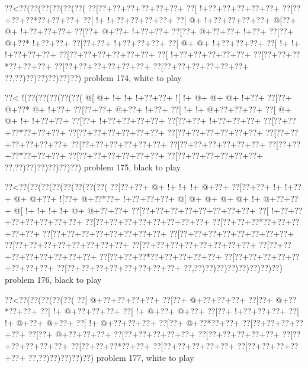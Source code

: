 \vbox{\vbox{\goo
\0??<\0??(\0??(\0??(\0??(\0??(\0??(
\0??[\0??+\0??+\0??+\0??+\0??+\0??+
\0??[\- !+\0??+\0??+\0??+\0??+\0??+
\0??[\0??+\0??+\0??*\0??+\0??+\0??+
\0??[\- !+\- !+\0??+\0??+\0??+\0??+
\0??[\- @+\- !+\0??+\0??+\0??+\0??+
\- @[\0??+\- @+\- !+\0??+\0??+\0??+
\0??[\0??+\- @+\0??+\- !+\0??+\0??+
\0??[\0??+\- @+\0??+\0??+\- !+\0??+
\0??[\0??+\- @+\0??*\- !+\0??+\0??+
\0??[\0??+\0??+\- !+\0??+\0??+\0??+
\0??[\- @+\- @+\- !+\0??+\0??+\0??+
\0??[\- !+\- !+\- !+\0??+\0??+\0??+
\0??[\0??+\0??+\0??+\0??+\0??+\0??+
\0??[\- !+\0??+\0??+\0??+\0??+\0??+
\0??[\0??+\0??+\0??*\0??+\0??+\0??+
\0??[\0??+\0??+\0??+\0??+\0??+\0??+
\0??[\0??+\0??+\0??+\0??+\0??+\0??+
\0??,\0??)\0??)\0??)\0??)\0??)\0??)
}
\hfil problem 174, white to play\hfil\break
}

\vbox{\vbox{\goo
\0??<\- !(\0??(\0??(\0??(\0??(\0??(
\- @[\- @+\- !+\- !+\- !+\0??+\0??+
\- ![\- !+\- @+\- @+\- @+\- !+\0??+
\0??[\0??+\- @+\0??*\- @+\- !+\0??+
\0??[\0??+\0??+\- @+\0??+\- !+\0??+
\0??[\- !+\- !+\- @+\0??+\0??+\0??+
\0??[\- @+\- @+\- !+\- !+\0??+\0??+
\0??[\0??+\- !+\0??+\0??+\0??+\0??+
\0??[\0??+\0??+\- !+\0??+\0??+\0??+
\0??[\0??+\0??+\0??*\0??+\0??+\0??+
\0??[\0??+\0??+\0??+\0??+\0??+\0??+
\0??[\0??+\0??+\0??+\0??+\0??+\0??+
\0??[\0??+\0??+\0??+\0??+\0??+\0??+
\0??[\0??+\0??+\0??+\0??+\0??+\0??+
\0??[\0??+\0??+\0??+\0??+\0??+\0??+
\0??[\0??+\0??+\0??*\0??+\0??+\0??+
\0??[\0??+\0??+\0??+\0??+\0??+\0??+
\0??[\0??+\0??+\0??+\0??+\0??+\0??+
\0??,\0??)\0??)\0??)\0??)\0??)\0??)
}
\hfil problem 175, black to play\hfil\break
}

\vbox{\vbox{\goo
\0??<\0??(\0??(\0??(\0??(\0??(\0??(\0??(\0??(
\0??[\0??+\0??+\- @+\- !+\- !+\- !+\- @+\0??+
\0??[\0??+\0??+\- !+\- !+\0??+\- @+\- @+\0??+
\- ![\0??+\- @+\0??*\0??+\- !+\0??+\0??+\0??+
\- @[\- @+\- @+\- @+\- @+\- !+\- @+\0??+\0??+
\- @[\- !+\- !+\- !+\- !+\- @+\- @+\0??+\0??+
\0??[\0??+\0??+\0??+\0??+\0??+\0??+\0??+\0??+
\0??[\- !+\0??+\0??+\0??+\0??+\0??+\0??+\0??+
\0??[\0??+\0??+\0??+\0??+\0??+\0??+\0??+\0??+
\0??[\0??+\0??+\0??*\0??+\0??+\0??+\0??+\0??+
\0??[\0??+\0??+\0??+\0??+\0??+\0??+\0??+\0??+
\0??[\0??+\0??+\0??+\0??+\0??+\0??+\0??+\0??+
\0??[\0??+\0??+\0??+\0??+\0??+\0??+\0??+\0??+
\0??[\0??+\0??+\0??+\0??+\0??+\0??+\0??+\0??+
\0??[\0??+\0??+\0??+\0??+\0??+\0??+\0??+\0??+
\0??[\0??+\0??+\0??*\0??+\0??+\0??+\0??+\0??+
\0??[\0??+\0??+\0??+\0??+\0??+\0??+\0??+\0??+
\0??[\0??+\0??+\0??+\0??+\0??+\0??+\0??+\0??+
\0??,\0??)\0??)\0??)\0??)\0??)\0??)\0??)\0??)
}
\hfil problem 176, black to play\hfil\break
}

\vbox{\vbox{\goo
\0??<\0??(\0??(\0??(\0??(\0??(
\0??[\- @+\0??+\0??+\0??+\0??+
\0??[\0??+\- @+\0??+\0??+\0??+
\0??[\0??+\- @+\0??*\0??+\0??+
\0??[\- !+\- @+\0??+\0??+\0??+
\0??[\- !+\- @+\0??+\- @+\0??+
\0??[\0??+\- !+\0??+\0??+\0??+
\0??[\- !+\- @+\0??+\- @+\0??+
\0??[\- !+\- @+\0??+\0??+\0??+
\0??[\0??+\- @+\0??*\0??+\0??+
\0??[\0??+\0??+\0??+\0??+\0??+
\0??[\0??+\- @+\0??+\0??+\0??+
\0??[\0??+\0??+\0??+\0??+\0??+
\0??[\0??+\0??+\0??+\0??+\0??+
\0??[\0??+\0??+\0??+\0??+\0??+
\0??[\0??+\0??+\0??*\0??+\0??+
\0??[\0??+\0??+\0??+\0??+\0??+
\0??[\0??+\0??+\0??+\0??+\0??+
\0??,\0??)\0??)\0??)\0??)\0??)
}
\hfil problem 177, white to play\hfil\break
}

